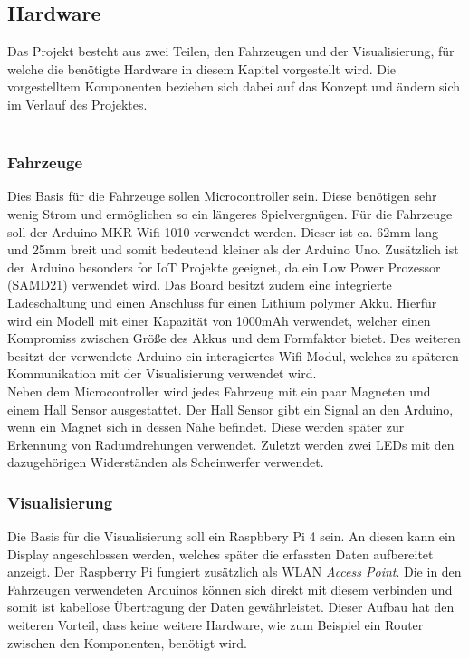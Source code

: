 \documentclass[.../Dokumentation.tex]{subfiles}
\begin{document}
    \subsection{Hardware}\label{sec-components-hardware}
    Das Projekt besteht aus zwei Teilen, den Fahrzeugen und der Visualisierung, für welche die benötigte Hardware in diesem Kapitel vorgestellt wird. Die vorgestelltem Komponenten beziehen sich dabei auf das Konzept und ändern sich im Verlauf des Projektes.\\~\\
    \subsubsection{Fahrzeuge}
	Dies Basis für die Fahrzeuge sollen Microcontroller sein. Diese benötigen sehr wenig Strom und ermöglichen so ein längeres Spielvergnügen. Für die Fahrzeuge soll der Arduino MKR Wifi 1010 verwendet werden. Dieser ist ca. 62mm lang und 25mm breit und somit bedeutend kleiner als der Arduino Uno. Zusätzlich ist der Arduino besonders for IoT Projekte geeignet, da ein Low Power Prozessor (SAMD21) verwendet wird. Das Board besitzt zudem eine integrierte Ladeschaltung und einen Anschluss für einen Lithium polymer Akku. Hierfür wird ein Modell mit einer Kapazität von 1000mAh verwendet, welcher einen Kompromiss zwischen Größe des Akkus und dem Formfaktor bietet. Des weiteren besitzt der verwendete Arduino ein interagiertes Wifi Modul, welches zu späteren Kommunikation mit der Visualisierung verwendet wird. \\
	Neben dem Microcontroller wird jedes Fahrzeug mit ein paar Magneten und einem Hall Sensor ausgestattet. Der Hall Sensor gibt ein Signal an den Arduino, wenn ein Magnet sich in dessen Nähe befindet. Diese werden später zur Erkennung von Radumdrehungen verwendet. Zuletzt werden zwei LEDs mit den dazugehörigen Widerständen als Scheinwerfer verwendet.
	
	\subsubsection{Visualisierung}
	Die Basis für die Visualisierung soll ein Raspbbery Pi 4 sein. An diesen kann ein Display angeschlossen werden, welches später die erfassten Daten aufbereitet anzeigt. Der Raspberry Pi fungiert zusätzlich als WLAN \textit{Access Point}. Die in den Fahrzeugen verwendeten Arduinos können sich direkt mit diesem verbinden und somit ist kabellose Übertragung der Daten gewährleistet. Dieser Aufbau hat den weiteren Vorteil, dass keine weitere Hardware, wie zum Beispiel ein Router zwischen den Komponenten, benötigt wird.
	
\end{document}
